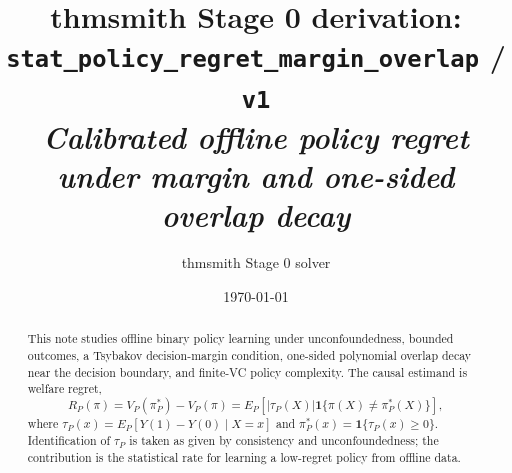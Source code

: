 \documentclass[11pt]{article}
\title{thmsmith Stage 0 derivation: \texttt{stat\_policy\_regret\_margin\_overlap} / \texttt{v1}%
  \\ \large\textit{Calibrated offline policy regret under margin and one-sided overlap decay}}
\author{thmsmith Stage 0 solver}
\date{\today}
\newcommand{\one}{\mathbf{1}}
\theoremstyle{definition}
\theoremstyle{plain}
\theoremstyle{remark}
\begin{document}
\maketitle


\begin{abstract}
This note studies offline binary policy learning under unconfoundedness,
bounded outcomes, a Tsybakov decision-margin condition, one-sided polynomial
overlap decay near the decision boundary, and finite-VC policy complexity.
The causal estimand is welfare regret,
\[
R_P(\pi)=V_P(\pi_P^*)-V_P(\pi)
      =E_P[|\tau_P(X)|\one\{\pi(X)\ne\pi_P^*(X)\}],
\]
where \(\tau_P(x)=E_P[Y(1)-Y(0)\mid X=x]\) and
\(\pi_P^*(x)=\one\{\tau_P(x)\ge0\}\).  Identification of \(\tau_P\) is taken
as given by consistency and unconfoundedness; the contribution is the
statistical rate for learning a low-regret policy from offline data.


\end{abstract}
\end{document}
